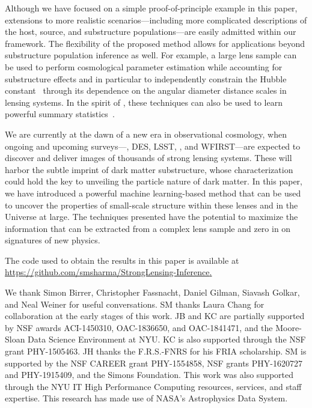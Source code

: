 \documentclass[twocolumn]{aastex63}
\begin{document}
Although we have focused on a simple proof-of-principle example in this paper, extensions to more realistic scenarios---including more complicated descriptions of the host, source, and substructure populations---are easily admitted within our framework.  The flexibility of the proposed method allows for applications beyond substructure population inference as well. For example, a large lens sample can be used to perform cosmological parameter estimation while accounting for substructure effects and in particular to independently constrain the Hubble constant~\citep{1907.02533,1907.04869} through its dependence on the angular diameter distance scales in lensing systems. In the spirit of \citet{Alsing:2017var}, these techniques can also be  used to learn powerful summary statistics~\citep{1805.12244}.

We are currently at the dawn of a new era in observational cosmology, when ongoing and upcoming surveys---\eg, DES, LSST, \Euclid, and WFIRST---are expected to discover and deliver images of thousands of strong lensing systems. These will harbor the subtle imprint of dark matter substructure, whose characterization could hold the key to unveiling the particle nature of dark matter. In this paper, we have introduced a powerful machine learning-based method that can be used to uncover the properties of small-scale structure within these lenses and in the Universe at large. The techniques presented have the potential to maximize the information that can be extracted from a complex lens sample and zero in on signatures of new physics.

The code used to obtain the results in this paper is available at \url{https://github.com/smsharma/StrongLensing-Inference}\href{https://github.com/smsharma/StrongLensing-Inference}.

\acknowledgments

We thank Simon Birrer, Christopher Fassnacht, Daniel Gilman, Siavash Golkar, and Neal Weiner for useful conversations. SM thanks Laura Chang for collaboration at the early stages of this work. JB and KC are partially supported by NSF awards ACI-1450310, OAC-1836650, and OAC-1841471, and the Moore-Sloan Data Science Environment at NYU. KC is also supported through the NSF grant PHY-1505463. JH thanks the F.R.S.-FNRS for his FRIA scholarship. SM is supported by the NSF CAREER grant PHY-1554858, NSF grants PHY-1620727 and PHY-1915409, and the Simons Foundation. This work was also supported through the NYU IT High Performance Computing resources, services, and staff expertise. This research has made use of NASA's Astrophysics Data System.
\end{document}
